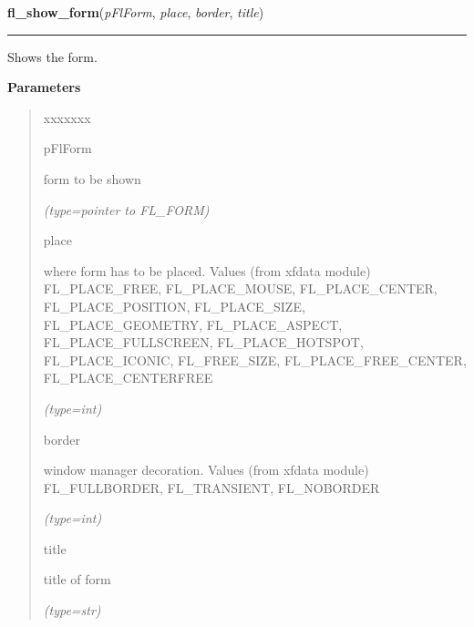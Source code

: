     \label{xformslib:flbasic:fl_show_form}

    \vspace{0.5ex}

\hspace{.8\funcindent}\begin{boxedminipage}{\funcwidth}

    \raggedright \textbf{fl\_show\_form}(\textit{pFlForm}, \textit{place}, \textit{border}, \textit{title})

    \vspace{-1.5ex}

    \rule{\textwidth}{0.5\fboxrule}
\setlength{\parskip}{2ex}
    Shows the form.

\setlength{\parskip}{1ex}
      \textbf{Parameters}
      \vspace{-1ex}

      \begin{quote}
        \begin{Ventry}{xxxxxxx}

          \item[pFlForm]

          form to be shown

            {\it (type=pointer to FL\_FORM)}

          \item[place]

          where form has to be placed. Values (from xfdata module) 
          FL\_PLACE\_FREE, FL\_PLACE\_MOUSE, FL\_PLACE\_CENTER, 
          FL\_PLACE\_POSITION, FL\_PLACE\_SIZE, FL\_PLACE\_GEOMETRY, 
          FL\_PLACE\_ASPECT, FL\_PLACE\_FULLSCREEN, FL\_PLACE\_HOTSPOT, 
          FL\_PLACE\_ICONIC, FL\_FREE\_SIZE, FL\_PLACE\_FREE\_CENTER, 
          FL\_PLACE\_CENTERFREE

            {\it (type=int)}

          \item[border]

          window manager decoration. Values (from xfdata module) 
          FL\_FULLBORDER, FL\_TRANSIENT, FL\_NOBORDER

            {\it (type=int)}

          \item[title]

          title of form

            {\it (type=str)}


\end{Ventry}
\end{quote}
\end{boxedminipage}
